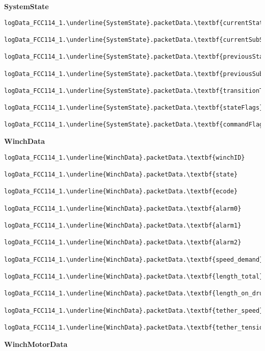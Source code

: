 \documentclass[10pt]{extarticle}
\begin{document}
\vspace{1cm}
{\Large \textbf{SystemState}}
\begin{Verbatim}[baselinestretch=.9,commandchars=\\\{\}]
logData_FCC114_1.\underline{SystemState}.packetData.\textbf{currentState}

logData_FCC114_1.\underline{SystemState}.packetData.\textbf{currentSubState}

logData_FCC114_1.\underline{SystemState}.packetData.\textbf{previousState}

logData_FCC114_1.\underline{SystemState}.packetData.\textbf{previousSubState}

logData_FCC114_1.\underline{SystemState}.packetData.\textbf{transitionTaken}

logData_FCC114_1.\underline{SystemState}.packetData.\textbf{stateFlags}

logData_FCC114_1.\underline{SystemState}.packetData.\textbf{commandFlags}
\end{Verbatim}
\vspace{1cm}
{\Large \textbf{WinchData}}
\begin{Verbatim}[baselinestretch=.9,commandchars=\\\{\}]
logData_FCC114_1.\underline{WinchData}.packetData.\textbf{winchID}

logData_FCC114_1.\underline{WinchData}.packetData.\textbf{state}

logData_FCC114_1.\underline{WinchData}.packetData.\textbf{ecode}

logData_FCC114_1.\underline{WinchData}.packetData.\textbf{alarm0}

logData_FCC114_1.\underline{WinchData}.packetData.\textbf{alarm1}

logData_FCC114_1.\underline{WinchData}.packetData.\textbf{alarm2}

logData_FCC114_1.\underline{WinchData}.packetData.\textbf{speed_demand}

logData_FCC114_1.\underline{WinchData}.packetData.\textbf{length_total}

logData_FCC114_1.\underline{WinchData}.packetData.\textbf{length_on_drum}

logData_FCC114_1.\underline{WinchData}.packetData.\textbf{tether_speed}

logData_FCC114_1.\underline{WinchData}.packetData.\textbf{tether_tension}
\end{Verbatim}
\newpage
{\Large \textbf{WinchMotorData}}
\end{document}
